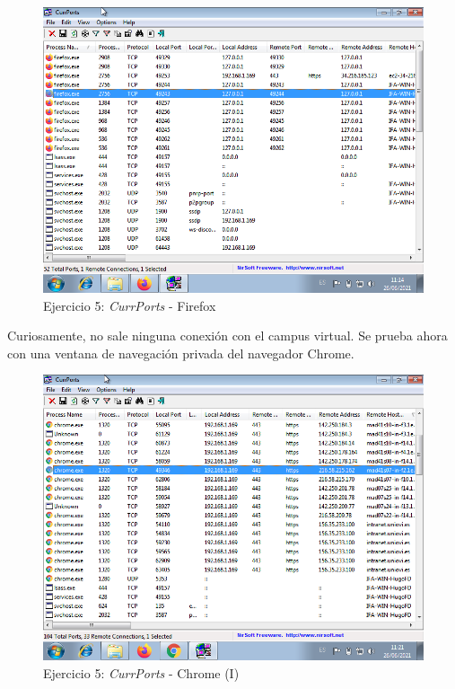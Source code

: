 \documentclass[11pt]{article}
\begin{document}
\begin{figure}[H]
    \caption{Ejercicio 5: \textit{CurrPorts} - Firefox}
  \centering
    \includegraphics[scale=0.7]{p05/e5-3.png}
\end{figure}

Curiosamente, no sale ninguna conexión con el campus virtual. Se prueba ahora con una ventana de navegación privada del navegador Chrome.

\begin{figure}[H]
    \caption{Ejercicio 5: \textit{CurrPorts} - Chrome (I)}
  \centering
    \includegraphics[scale=0.7]{p05/e5-4.png}
\end{figure}
\end{document}
